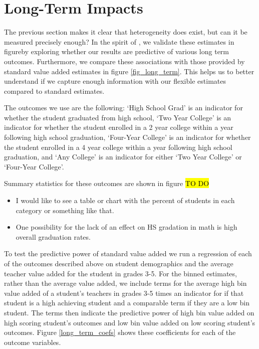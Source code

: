 \documentclass{article}
\theoremstyle{definition}
\theoremstyle{definition}
\theoremstyle{definition}
\theoremstyle{definition}
\begin{document}
\section{Long-Term Impacts} \label{long}

    The previous section makes it clear that heterogeneity does exist, but can it be measured precisely enough? In the spirit of \cite{chetty2014measuring2}, we validate these estimates in figureby exploring whether our results are predictive of various long term outcomes. Furthermore, we compare these associations with those provided by standard value added estimates in figure \ref{fig_long_term}. This helps us to better understand if we capture enough information with our flexible estimates compared to standard estimates.
    
    The outcomes we use are the following: `High School Grad' is an indicator for whether the student graduated from high school, `Two Year College' is an indicator for whether the student enrolled in a 2 year college within a year following high school graduation, `Four-Year College' is an indicator for whether the student enrolled in a 4 year college within a year following high school graduation, and `Any College' is an indicator for either `Two Year College' or `Four-Year College'. 
    
    Summary statistics for these outcomes are shown in figure \hl{TO DO}
    \begin{itemize}
        \item I would like to see a table or chart with the percent of students in each category or something like that. 
        \item One possibility for the lack of an effect on HS gradation in math is high overall graduation rates. 
    \end{itemize}
    
    To test the predictive power of standard value added we run a regression of each of the outcomes described above on student demographics and the average teacher value added for the student in grades 3-5. For the binned estimates, rather than the average value added, we include terms for the average high bin value added of a student's teachers in grades 3-5 times an indicator for if that student is a high achieving student and a comparable term if they are a low bin student. The terms then indicate the predictive power of high bin value added on high scoring student's outcomes and low bin value added on low scoring student's outcomes. Figure \ref{long_term_coefs} shows these coefficients for each of the outcome variables. 
    
\end{document}
